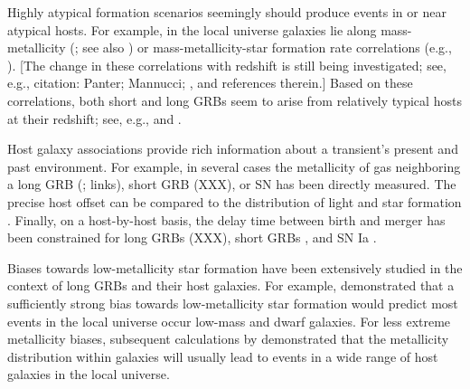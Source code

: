 \documentclass[nofootinbib,twocolumn,prd]{emulateapj}
\newcommand\editremark[1]{{\color{red}#1}}
\begin{document}
%
Highly atypical formation scenarios seemingly should produce events in or near atypical hosts.  
For example, in the local universe galaxies lie along mass-metallicity  (\cite{2004ApJ...613..898T}; see also
\cite{sfr-ZEvolution-ByGalaxy-Panter2008})
or mass-metallicity-star formation rate  correlations (e.g., \cite{2010MNRAS.408.2115M}).
[The change in these correlations with redshift is still being investigated; see, e.g., \editremark{citation: Panter;
    Mannucci; }, \cite{2011ApJ...739....1L} and references therein.]
Based on these correlations, both short  and long GRBs seem to arise from
relatively typical hosts at their redshift; see, e.g., \cite{grb-short-Hosts-Berger2008} and \cite{grb-long-HostMetallicityVsTrend-Mannucci2010}.


Host galaxy associations provide rich information about a transient's present and past environment.
%
For example, in several cases the metallicity of gas neighboring a long GRB (\citet{ 2008AJ....135.1136M}; \citet{2010AJ....140.1557L}
\editremark{links}), short GRB (\editremark{XXX}), or SN has been directly measured.
%
The precise host offset can be compared to the distribution of light and star formation  \citep{2010ApJ...708....9F}.
%
Finally,  on a host-by-host basis, the delay time between birth and merger has been constrained for long GRBs (\editremark{XXX}), short GRBs \citep{2010ApJ...725.1202L}, and
  SN Ia \citep{2011MNRAS.412.1508M}.
%



Biases towards low-metallicity star formation have been extensively studied in the context of long GRBs and their host galaxies.
%
For example, \cite{2009ApJ...702..377K} demonstrated that a sufficiently strong bias towards low-metallicity star formation would predict
most  events in the local universe occur low-mass and dwarf galaxies.
For less extreme metallicity biases, subsequent calculations by  \citet{2011MNRAS.417..567N} demonstrated that the
metallicity distribution within galaxies will usually lead to events in a wide range of host galaxies in the local universe.
\end{document}
